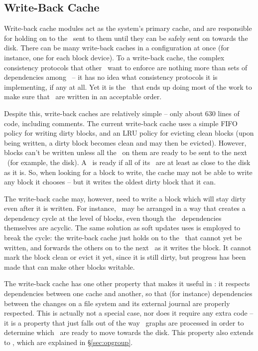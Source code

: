 \subsection{Write-Back Cache}
\label{sec:modules:wbcache}

Write-back cache modules act as the system's primary cache, and are responsible
for holding on to the \chdescs\ sent to them until they can be safely sent on
towards the disk. There can be many write-back caches in a configuration at once
(for instance, one for each block device). To a write-back cache, the complex
consistency protocols that other \modules\ want to enforce are nothing more than
sets of dependencies among \chdescs\ -- it has no idea what consistency
protocols it is implementing, if any at all. Yet it is the \module\ that ends up
doing most of the work to make sure that \chdescs\ are written in an acceptable
order.

Despite this, write-back caches are relatively simple -- only about 630 lines of
code, including comments. The current write-back cache uses a simple FIFO policy
for writing dirty blocks, and an LRU policy for evicting clean blocks (upon
being written, a dirty block becomes clean and may then be evicted). However,
blocks can't be written unless all the \chdescs\ on them are ready to be sent to
the next \module\ (for example, the disk). A \chdesc\ is ready if all of its
\befores\ are at least as close to the disk as it is. So, when looking for a
block to write, the cache may not be able to write any block it chooses -- but
it writes the oldest dirty block that it can.

The write-back cache may, however, need to write a block which will stay dirty
even after it is written. For instance, \chdescs\ may be arranged in a way that
creates a dependency cycle at the level of blocks, even though the \chdesc\
dependencies themselves are acyclic. The same solution as soft updates uses is
employed to break the cycle: the write-back cache just holds on to the \chdescs\
that cannot yet be written, and forwards the others on to the next \module\ as
it writes the block. It cannot mark the block clean or evict it yet, since it is
still dirty, but progress has been made that can make other blocks writable.

The write-back cache has one other property that makes it useful in \Kudos: it
respects dependencies between one cache and another, so that (for instance)
dependencies between the changes on a file system and its external journal are
properly respected. This is actually not a special case, nor does it require any
extra code -- it is a property that just falls out of the way \chdesc\ graphs
are processed in order to determine which \chdescs\ are ready to move towards
the disk. This property also extends to \opgroups, which
are explained in \S\ref{sec:opgroup}.
